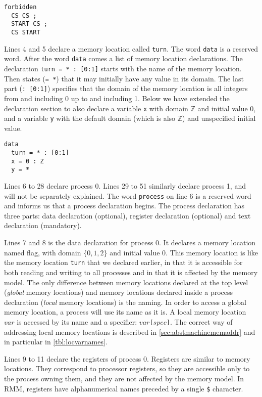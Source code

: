 \documentclass[a4paper]{article}
\begin{document}
\begin{verbatim}
forbidden
  CS CS ; 
  START CS ;
  CS START
\end{verbatim}

Lines 4 and 5 declare a memory location called \verb+turn+. The word
\verb+data+ is a reserved word. After the word \verb+data+ comes a
list of memory location declarations. The declaration
\verb+turn = * : [0:1]+ starts with the name of the memory location.
Then states (\verb+= *+) that it may initially have any value in its
domain. The last part (\verb+: [0:1]+) specifies that the domain of
the memory location is all integers from and including 0 up to and
including 1. Below we have extended the declaration section to also
declare a variable \verb+x+ with domain $\mathbb{Z}$ and initial
value 0, and a variable \verb+y+ with the default domain (which is
also $\mathbb{Z}$) and unspecified initial value.

\begin{verbatim}
data
  turn = * : [0:1]
  x = 0 : Z
  y = *
\end{verbatim}

Lines 6 to 28 declare process 0. Lines 29 to 51 similarly declare
process 1, and will not be separately explained. The word
\verb+process+ on line 6 is a reserved word and informs us that a
process declaration begins. The process declaration has three parts:
data declaration (optional), register declaration (optional) and text
declaration (mandatory).

Lines 7 and 8 is the data declaration for process 0. It declares a
memory location named flag, with domain $\{0,1,2\}$ and initial value
0. This memory location is like the memory location \verb+turn+ that
we declared earlier, in that it is accessible for both reading and
writing to all processes and in that it is affected by the memory
model. The only difference between memory locations declared at the
top level (\emph{global} memory locations) and memory locations
declared inside a process declaration (\emph{local} memory locations)
is the naming. In order to access a global memory location, a process
will use its name as it is. A local memory location $var$ is accessed
by its name and a specifier: $var$\verb+[+$spec$\verb+]+. The correct
way of addressing local memory locations is described in
\cref{sec:abstmachinememaddr} and in particular in
\cref{tbl:locvarnames}.

Lines 9 to 11 declare the registers of process 0. Registers are
similar to memory locations. They correspond to processor registers,
so they are accessible only to the process owning them, and they are
not affected by the memory model. In RMM, registers have
alphanumerical names preceded by a single \verb+$+ character.
\end{document}
